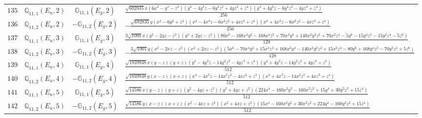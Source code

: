 \documentclass[fleqn,8pt,landscape]{jsarticle}
\begin{document}
\begin{table}[ht!]
\begin{center}
\begin{tabular}{cccl}
$ 135 $ & $ \mathbb{Q}_{11,1}(E_{u},2) $ & $ \mathbb{G}_{11,1}(E_{g},2) $ & $ \frac{\sqrt{692835} x \left(6 x^{2} - y^{2} - z^{2}\right) \left(y^{4} - 4 y^{3} z - 6 y^{2} z^{2} + 4 y z^{3} + z^{4}\right) \left(y^{4} + 4 y^{3} z - 6 y^{2} z^{2} - 4 y z^{3} + z^{4}\right)}{256} $ \\
$ 136 $ & $ \mathbb{Q}_{11,2}(E_{u},2) $ & $ -\mathbb{G}_{11,2}(E_{g},2) $ & $ - \frac{\sqrt{692835} y \left(x^{2} - 6 y^{2} + z^{2}\right) \left(x^{4} - 4 x^{3} z - 6 x^{2} z^{2} + 4 x z^{3} + z^{4}\right) \left(x^{4} + 4 x^{3} z - 6 x^{2} z^{2} - 4 x z^{3} + z^{4}\right)}{256} $ \\
$ 137 $ & $ \mathbb{Q}_{11,1}(E_{u},3) $ & $ \mathbb{G}_{11,1}(E_{g},3) $ & $ \frac{3 \sqrt{1001} x \left(y^{2} - 2 y z - z^{2}\right) \left(y^{2} + 2 y z - z^{2}\right) \left(80 x^{6} - 168 x^{4} y^{2} - 168 x^{4} z^{2} + 70 x^{2} y^{4} + 140 x^{2} y^{2} z^{2} + 70 x^{2} z^{4} - 5 y^{6} - 15 y^{4} z^{2} - 15 y^{2} z^{4} - 5 z^{6}\right)}{128} $ \\
$ 138 $ & $ \mathbb{Q}_{11,2}(E_{u},3) $ & $ -\mathbb{G}_{11,2}(E_{g},3) $ & $ - \frac{3 \sqrt{1001} y \left(x^{2} - 2 x z - z^{2}\right) \left(x^{2} + 2 x z - z^{2}\right) \left(5 x^{6} - 70 x^{4} y^{2} + 15 x^{4} z^{2} + 168 x^{2} y^{4} - 140 x^{2} y^{2} z^{2} + 15 x^{2} z^{4} - 80 y^{6} + 168 y^{4} z^{2} - 70 y^{2} z^{4} + 5 z^{6}\right)}{128} $ \\
$ 139 $ & $ \mathbb{Q}_{11,1}(E_{u},4) $ & $ \mathbb{G}_{11,1}(E_{g},4) $ & $ \frac{\sqrt{1939938} x \left(y - z\right) \left(y + z\right) \left(y^{4} - 4 y^{3} z - 14 y^{2} z^{2} - 4 y z^{3} + z^{4}\right) \left(y^{4} + 4 y^{3} z - 14 y^{2} z^{2} + 4 y z^{3} + z^{4}\right)}{512} $ \\
$ 140 $ & $ \mathbb{Q}_{11,2}(E_{u},4) $ & $ -\mathbb{G}_{11,2}(E_{g},4) $ & $ \frac{\sqrt{1939938} y \left(x - z\right) \left(x + z\right) \left(x^{4} - 4 x^{3} z - 14 x^{2} z^{2} - 4 x z^{3} + z^{4}\right) \left(x^{4} + 4 x^{3} z - 14 x^{2} z^{2} + 4 x z^{3} + z^{4}\right)}{512} $ \\
$ 141 $ & $ \mathbb{Q}_{11,1}(E_{u},5) $ & $ \mathbb{G}_{11,1}(E_{g},5) $ & $ \frac{\sqrt{14586} x \left(y - z\right) \left(y + z\right) \left(y^{2} - 4 y z + z^{2}\right) \left(y^{2} + 4 y z + z^{2}\right) \left(224 x^{4} - 160 x^{2} y^{2} - 160 x^{2} z^{2} + 15 y^{4} + 30 y^{2} z^{2} + 15 z^{4}\right)}{512} $ \\
$ 142 $ & $ \mathbb{Q}_{11,2}(E_{u},5) $ & $ -\mathbb{G}_{11,2}(E_{g},5) $ & $ \frac{\sqrt{14586} y \left(x - z\right) \left(x + z\right) \left(x^{2} - 4 x z + z^{2}\right) \left(x^{2} + 4 x z + z^{2}\right) \left(15 x^{4} - 160 x^{2} y^{2} + 30 x^{2} z^{2} + 224 y^{4} - 160 y^{2} z^{2} + 15 z^{4}\right)}{512} $ \\

\end{tabular}
\end{center}
\end{table}
\end{document}
